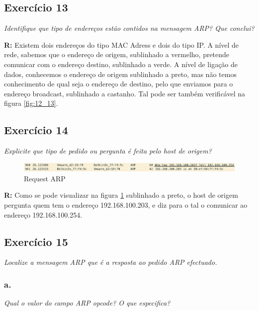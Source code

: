 \documentclass{llncs}
\begin{document}
\subsection{Exercício 13}
\emph{Identifique que tipo de endereços estão contidos na mensagem ARP? Que conclui?}
\\ \par
\textbf{R:} Existem dois endereços do tipo MAC Adress e dois do tipo IP. A nível de rede, sabemos que o endereço de origem, sublinhado a vermelho, pretende comunicar com o endereço destino, sublinhado a verde. A nível de ligação de dados, conhecemos o endereço de origem sublinhado a preto, mas não temos conhecimento de qual seja o endereço de destino, pelo que enviamos para o endereço broadcast, sublinhado a castanho. Tal pode ser também verificável na figura \ref{fig:12_13}.


\subsection{Exercício 14}
\emph{Explicite que tipo de pedido ou pergunta é feita pelo host de origem?}

\begin{figure}[H]
\begin{center}
\includegraphics[scale=0.45]{14.png} 
\end{center}
\caption{\label{fig:14}Request ARP}
\end{figure} 
\par
\textbf{R:} Como se pode visualizar na figura \ref{fig:14} sublinhado a preto, o host de origem pergunta quem tem o endereço 192.168.100.203, e diz para o tal o comunicar ao endereço 192.168.100.254.


\subsection{Exercício 15}
\emph{Localize a mensagem ARP que é a resposta ao pedido ARP efectuado.}

\subsubsection{a.}
\emph{Qual o valor do campo ARP opcode? O que especifica?}
\end{document}
